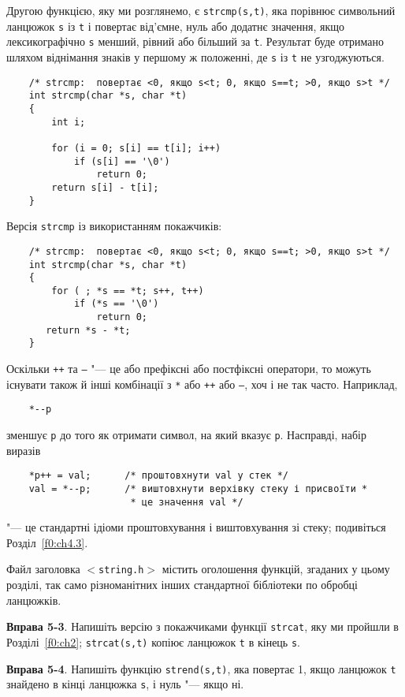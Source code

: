 \documentclass[a4paper,12pt]{book}
\begin{document}
  Другою функцією, яку ми розглянемо, є \texttt{strcmp(s,t)}, яка порівнює символьний
  ланцюжок \texttt{s} із \texttt{t} і повертає від'ємне, нуль або додатнє значення, якщо
  лексикографічно \texttt{s} менший, рівний або більший за \texttt{t}. Результат буде
  отримано шляхом віднімання знаків у першому ж положенні, де \texttt{s} із \texttt{t} не
  узгоджуються.
  \begin{verbatim}
    /* strcmp:  повертає <0, якщо s<t; 0, якщо s==t; >0, якщо s>t */
    int strcmp(char *s, char *t)
    {
        int i;

        for (i = 0; s[i] == t[i]; i++)
            if (s[i] == '\0')
                return 0;
        return s[i] - t[i];
    }
  \end{verbatim}

  Версія \texttt{strcmp} із використанням покажчиків:
  \begin{verbatim}
    /* strcmp:  повертає <0, якщо s<t; 0, якщо s==t; >0, якщо s>t */
    int strcmp(char *s, char *t)
    {
        for ( ; *s == *t; s++, t++)
            if (*s == '\0')
                return 0;
       return *s - *t;
    }
  \end{verbatim}

  Оскільки \texttt{++} та \texttt{--} "--- це або префіксні або постфіксні оператори, то можуть
  існувати також й інші комбінації з \texttt{*} або \texttt{++} або \texttt{--}, хоч і не
  так часто. Наприклад,
  \begin{verbatim}
    *--p
  \end{verbatim}
  зменшує \texttt{p} до того як отримати символ, на який вказує \texttt{p}. Насправді,
  набір виразів
  \begin{verbatim}
    *p++ = val;      /* проштовхнути val у стек */
    val = *--p;      /* виштовхнути верхівку стеку і присвоїти *
                      * це значення val */
  \end{verbatim}
  "--- це стандартні ідіоми проштовхування і виштовхування зі стеку; подивіться
  Розділ~\ref{f0:ch4.3}.

  Файл заголовка \texttt{\mbox{$<$}string.h\mbox{$>$}} містить оголошення функцій, згаданих у цьому
  розділі, так само різноманітних інших стандартної бібліотеки по обробці ланцюжків.

  \textbf{Вправа 5-3}. Напишіть версію з покажчиками функції \texttt{strcat}, яку ми пройшли
  в Розділі~\ref{f0:ch2}; \texttt{strcat(s,t)} копіює ланцюжок \texttt{t} в кінець
  \texttt{s}.

  \textbf{Вправа 5-4}. Напишіть функцію \texttt{strend(s,t)}, яка повертає 1, якщо ланцюжок
  \texttt{t} знайдено в кінці ланцюжка \texttt{s}, і нуль "--- якщо ні.
\end{document}
